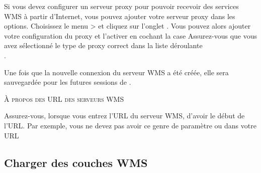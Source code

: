 Si vous devez configurer un serveur proxy pour pouvoir recevoir des services WMS à partir d'Internet, vous pouvez ajouter votre serveur proxy dans les options. Choisissez le menu  >  et cliquez sur l'onglet . Vous pouvez alors ajouter votre configuration du proxy et l'activer en cochant la case  Assurez-vous que vous avez sélectionné le type de proxy correct dans la liste  déroulante\\ .

Une fois que la nouvelle connexion du serveur WMS a été créée, elle sera sauvegardée pour les futures sessions de \qg.

\begin{Tip}[ht]\caption{\textsc{À propos des URL des serveurs WMS}}
Assurez-vous, lorsque vous entrez l'URL du serveur WMS, d'avoir le début de l'URL. Par exemple, vous ne devez pas avoir ce genre de paramètre   ou  dans votre URL
\end{Tip}

\subsection{Charger des couches WMS}\label{sec:ogc-wms-layers}

